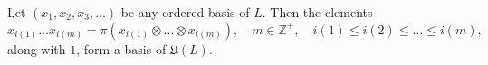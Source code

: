 Let $(x_1, x_2, x_3, \dots)$ be any ordered basis of $L$. Then the elements
$$
x_{i(1)} \dots x_{i(m)} = \pi(x_{i(1)} \otimes \dots \otimes x_{i(m)}), \quad m \in \mathbb{Z}^+, \quad i(1) \leq i(2) \leq \dots \leq i(m),
$$
along with $1$, form a basis of $\mathfrak{U}(L)$.
